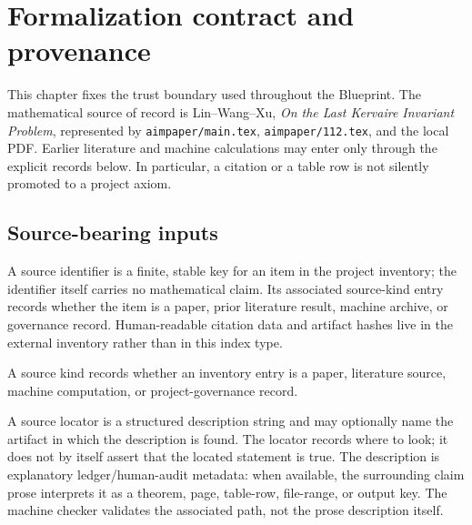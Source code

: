 \chapter{Formalization contract and provenance}
\label{chap:formalization-contract}

This chapter fixes the trust boundary used throughout the Blueprint.  The
mathematical source of record is Lin--Wang--Xu, \emph{On the Last Kervaire
Invariant Problem}, represented by \texttt{aimpaper/main.tex},
\texttt{aimpaper/112.tex}, and the local PDF.  Earlier literature and machine
calculations may enter only through the explicit records below.  In
particular, a citation or a table row is not silently promoted to a project
axiom.

\section{Source-bearing inputs}

\begin{definition}
  \label{def:source-id}
  \leanok
  A source identifier is a finite, stable key for an item in the project
  inventory; the identifier itself carries no mathematical claim.  Its
  associated source-kind entry records whether the item is a paper, prior
  literature result, machine archive, or governance record.
  Human-readable citation data and artifact hashes live in the external
  inventory rather than in this index type.
\end{definition}

\begin{definition}
  \label{def:source-kind}
  \leanok
  A source kind records whether an inventory entry is a paper, literature
  source, machine computation, or project-governance record.
\end{definition}

\begin{definition}
  \label{def:locator}
  \leanok
  A source locator is a structured description string and may optionally
  name the artifact in which the description is found.  The locator records
  where to look; it does not by itself assert that the located statement is
  true.  The description is explanatory ledger/human-audit metadata: when
  available, the surrounding claim prose interprets it as a theorem, page,
  table-row, file-range, or output key.  The machine checker validates the
  associated path, not the prose description itself.
\end{definition}

